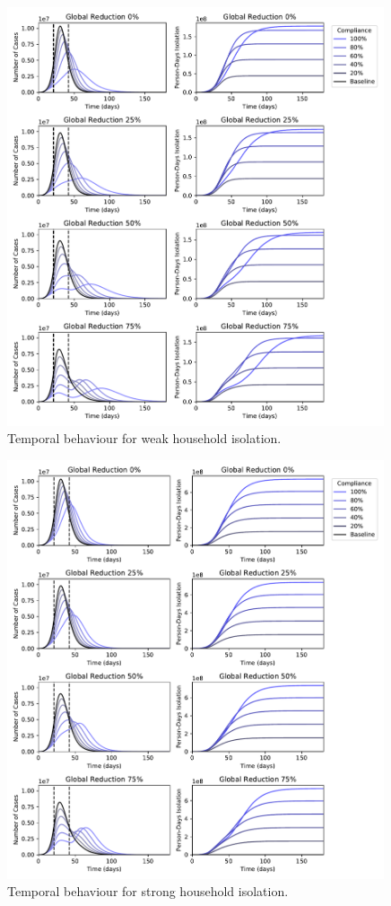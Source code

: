 \documentclass[10pt,a4paper]{article}
\begin{document}
\begin{figure}[H]
\begin{center}
  \includegraphics[width=0.99\textwidth]{figures/time_series_weak.pdf}
\end{center}
\caption{Temporal behaviour for weak household isolation.}
\end{figure}

\clearpage


\begin{figure}[H]
\begin{center}
  \includegraphics[width=0.99\textwidth]{figures/time_series_strong.pdf}
\end{center}
\caption{Temporal behaviour for strong household isolation.}
\end{figure}
\end{document}
